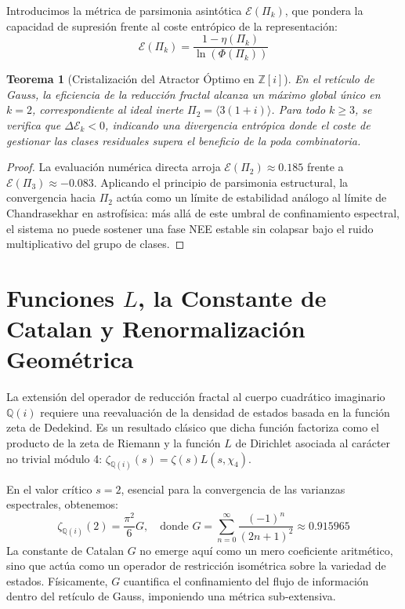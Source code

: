 \documentclass[sn-mathphys]{sn-jnl}
\newtheorem{theorem}{Teorema}[section]
\theoremstyle{definition} %
\begin{document}
Introducimos la métrica de parsimonia asintótica $\mathcal{E}(\Pi_k)$, que pondera la capacidad de supresión frente al coste entrópico de la representación:
\begin{equation}
    \mathcal{E}(\Pi_k) = \frac{1 - \eta(\Pi_k)}{\ln(\Phi(\Pi_k))}
\end{equation}

\begin{theorem}[{Cristalización del Atractor Óptimo en $\mathbb{Z}[i]$}]
\label{thm:chandrasekhar}
En el retículo de Gauss, la eficiencia de la reducción fractal alcanza un máximo global único en $k=2$, correspondiente al ideal inerte $\Pi_2 = \langle 3(1+i) \rangle$. Para todo $k \ge 3$, se verifica que $\Delta \mathcal{E}_k < 0$, indicando una divergencia entrópica donde el coste de gestionar las clases residuales supera el beneficio de la poda combinatoria.
\end{theorem}

\begin{proof}
La evaluación numérica directa arroja $\mathcal{E}(\Pi_2) \approx 0.185$ frente a $\mathcal{E}(\Pi_3) \approx -0.083$. Aplicando el principio de parsimonia estructural, la convergencia hacia $\Pi_2$ actúa como un límite de estabilidad análogo al límite de Chandrasekhar en astrofísica: más allá de este umbral de confinamiento espectral, el sistema no puede sostener una fase NEE estable sin colapsar bajo el ruido multiplicativo del grupo de clases.
\end{proof}

\section{Funciones \texorpdfstring{$L$}{L}, la Constante de Catalan y Renormalización Geométrica}

La extensión del operador de reducción fractal al cuerpo cuadrático imaginario $\mathbb{Q}(i)$ requiere una reevaluación de la densidad de estados basada en la función zeta de Dedekind. Es un resultado clásico que dicha función factoriza como el producto de la zeta de Riemann y la función $L$ de Dirichlet asociada al carácter no trivial módulo 4: $\zeta_{\mathbb{Q}(i)}(s) = \zeta(s) L(s, \chi_4)$.

En el valor crítico $s=2$, esencial para la convergencia de las varianzas espectrales, obtenemos:
\begin{equation}
    \zeta_{\mathbb{Q}(i)}(2) = \frac{\pi^2}{6} G, \quad \text{donde } G = \sum_{n=0}^\infty \frac{(-1)^n}{(2n+1)^2} \approx 0.915965
\end{equation}
La constante de Catalan $G$ no emerge aquí como un mero coeficiente aritmético, sino que actúa como un operador de restricción isométrica sobre la variedad de estados. Físicamente, $G$ cuantifica el confinamiento del flujo de información dentro del retículo de Gauss, imponiendo una métrica sub-extensiva.
\end{document}
